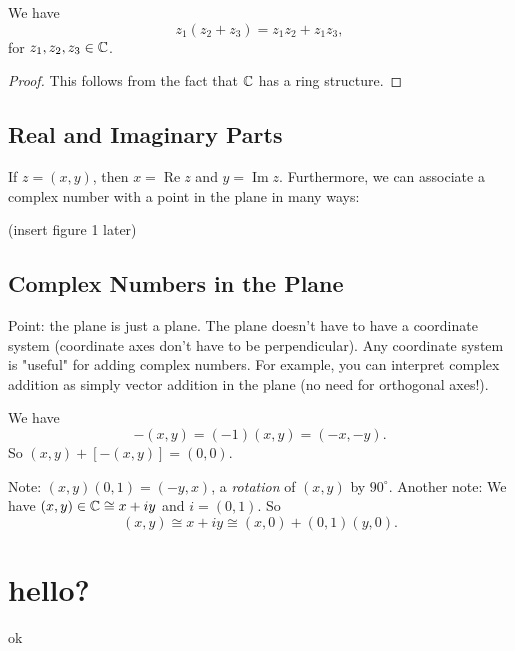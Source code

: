 \begin{theorem}
   We have \[
       z_1(z_2+z_3)=z_1z_2+z_1z_3,
   \]
   for $z_1,z_2,z_3 \in \mathbb{C}$. 
\end{theorem}
\begin{proof}
    This follows from the fact that $\mathbb{C}$ has a ring structure.
\end{proof}
\subsection{Real and Imaginary Parts}
\begin{definition}
    If $z=(x,y)$, then $x=\operatorname{Re}z$ and $y=\operatorname{Im}z.$ Furthermore, we can associate a complex number with a point in the plane in many ways:
\end{definition}
(insert figure 1 later)

\vspace{3mm}

\subsection{Complex Numbers in the Plane}
Point: the plane is just a plane. The plane doesn't have to have a coordinate system (coordinate axes don't have to be perpendicular). Any coordinate system is "useful" for adding complex numbers. For example, you can interpret complex addition as simply vector addition in the plane (no need for orthogonal axes!).

\begin{definition}
    We have \[
        -(x,y)=(-1)(x,y)=(-x,-y).
    \]
    So $(x,y)+[-(x,y)]=(0,0)$.
\end{definition}

Note: $(x,y)(0,1)=(-y,x)$, a \textit{rotation} of $(x,y)$ by $90^{\circ}$.
Another note: We have $(x,y)\in\mathbb{C} \cong x+iy$ and $i=(0,1).$ So 
\[
(x,y) \cong x+iy \cong (x,0)+(0,1)(y,0).
\]
\section{hello?}
\begin{definition}
    ok
\end{definition}
